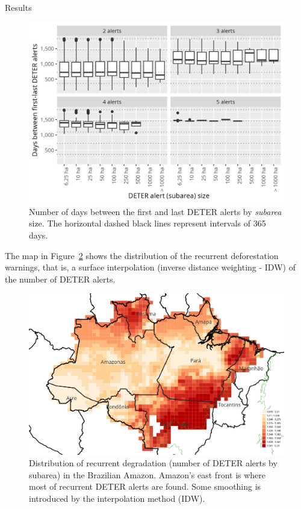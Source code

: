 \documentclass[20pt]{beamer}
\begin{document}
\begin{frame}[fragile,t]
\begin{columns}[t]
\begin{column}{0.33\linewidth}
\begin{block}{Results\vphantom{g}}
\begin{figure}[h] 
    \begin{center}
        \includegraphics[width=\linewidth]{./figures/plot_days_first_to_last.png}
        \caption{Number of days between the first and last DETER alerts by \textit{subarea} size. The horizontal dashed black lines represent intervals of 365 days.}
    \label{fig:plot_days_first_to_last}
    \end{center}
\end{figure}

        The map in Figure~\ref{fig:nwarnings_idw_map} shows the distribution of the recurrent deforestation warnings, that is, a surface interpolation (inverse distance weighting - IDW) of the number of DETER alerts.

\begin{figure}[h] 
    \begin{center}
        \includegraphics[width=\linewidth]{./figures/nwarnings_idw_map_with_legend.png}
        \caption{Distribution of recurrent degradation (number of
        DETER alerts by subarea) in the Brazilian Amazon. Amazon's east front is
        where most of recurrent DETER alerts are found. Some smoothing is introduced by the interpolation method (IDW).}
    \label{fig:nwarnings_idw_map}
    \end{center}
\end{figure}


\end{block}
\end{column}
\end{columns}
\end{frame}
\end{document}
